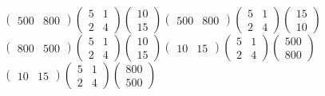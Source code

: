 \begin{minipage}[t]{\dimexpr\linewidth-2mm\relax}
\begin{choicesv}{$\begin{pmatrix} 500 & 800 \end{pmatrix}\begin{pmatrix} 5 & 1 \\ 2 & 4 \end{pmatrix}\begin{pmatrix} 10 \\ 15 \end{pmatrix}$}{$\begin{pmatrix} 500 & 800 \end{pmatrix}\begin{pmatrix} 5 & 1 \\ 2 & 4 \end{pmatrix}\begin{pmatrix} 15 \\ 10 \end{pmatrix}$}{$\begin{pmatrix} 800 & 500 \end{pmatrix}\begin{pmatrix} 5 & 1 \\ 2 & 4 \end{pmatrix}\begin{pmatrix} 10 \\ 15 \end{pmatrix}$}{$\begin{pmatrix} 10 & 15 \end{pmatrix}\begin{pmatrix} 5 & 1 \\ 2 & 4 \end{pmatrix}\begin{pmatrix} 500 \\ 800 \end{pmatrix}$}{$\begin{pmatrix} 10 & 15 \end{pmatrix}\begin{pmatrix} 5 & 1 \\ 2 & 4 \end{pmatrix}\begin{pmatrix} 800 \\ 500 \end{pmatrix}$}\end{choicesv}\end{minipage}
